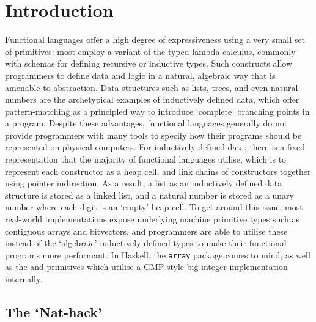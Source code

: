 \section{Introduction}\label{sec:intro}

Functional languages offer a high degree of expressiveness using a very small
set of primitives: most employ a variant of the typed lambda calculus, commonly
with schemas for defining recursive or inductive types. Such constructs allow
programmers to define data and logic in a natural, algebraic way that is
amenable to abstraction. Data structures such as lists, trees, and even natural
numbers are the archetypical examples of inductively defined data, which offer
pattern-matching as a principled way to introduce `complete' branching points
in a program. Despite these advantages, functional languages generally do not
provide programmers with many tools to specify how their programs should be
represented on physical computers. For inductively-defined data, there is a
fixed representation that the majority of functional languages utilise, which
is to represent each constructor as a heap cell, and link chains of
constructors together using pointer indirection. As a result, a list as an
inductively defined data structure is stored as a linked list, and a natural
number is stored as a unary number where each digit is an `empty' heap cell. To
get around this issue, most real-world implementations expose underlying
machine primitive types such as contiguous arrays and bitvectors, and
programmers are able to utilise these instead of the `algebraic'
inductively-defined types to make their functional programs more performant. In
Haskell, the \texttt{array} package comes to mind, as well as the 
and  primitives which utilise a GMP-style big-integer
implementation internally.

\subsection{The `Nat-hack'}

